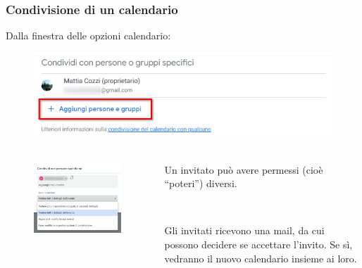 \documentclass[handout]{beamer}
\begin{document}
\begin{frame}
\frametitle{Condivisione di un calendario}
Dalla finestra delle opzioni calendario:
\begin{figure}
  \includegraphics[width=.5\columnwidth]{img/calendarshare.png}
\end{figure}

\begin{columns}
  \begin{column}{.5\textwidth}
    \begin{figure}
      \includegraphics[width=\columnwidth]{img/calendarshare2.png}
    \end{figure}
  \end{column}
  \begin{column}{.4\textwidth}
    Un invitato può avere permessi (cioè ``poteri'') diversi.

    ~

    Gli invitati ricevono una mail, da cui possono decidere se accettare l'invito. Se sì, vedranno il nuovo calendario insieme ai loro.
  \end{column}
\end{columns}
\end{frame}
\end{document}
